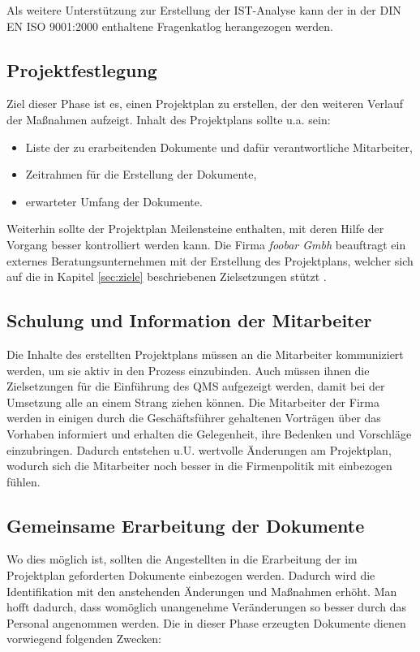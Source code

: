 Als weitere Unterstützung zur Erstellung der IST-Analyse kann der in
der DIN EN ISO 9001:2000 enthaltene Fragenkatlog herangezogen werden.

\subsection{Projektfestlegung}
Ziel dieser Phase ist es, einen Projektplan zu erstellen, der den weiteren
Verlauf der Maßnahmen aufzeigt. Inhalt des Projektplans sollte u.a. sein:

\begin{itemize}
  \item Liste der zu erarbeitenden Dokumente und dafür verantwortliche
  Mitarbeiter,
  \item Zeitrahmen für die Erstellung der Dokumente,
  \item erwarteter Umfang der Dokumente.
\end{itemize}

Weiterhin sollte der Projektplan Meilensteine enthalten, mit deren Hilfe der 
Vorgang besser kontrolliert werden kann. Die Firma \emph{foobar Gmbh} 
beauftragt ein externes Beratungsunternehmen mit der Erstellung des 
Projektplans, welcher sich auf die in Kapitel \ref{sec:ziele} beschriebenen 
Zielsetzungen stützt \citep{wittmeier}.

\subsection{Schulung und Information der Mitarbeiter}
Die Inhalte des erstellten Projektplans müssen an die Mitarbeiter kommuniziert
werden, um sie aktiv in den Prozess einzubinden. Auch müssen ihnen die
Zielsetzungen für die Einführung des QMS aufgezeigt werden, damit bei der
Umsetzung alle an einem Strang ziehen können.
Die Mitarbeiter der Firma werden in einigen durch die Geschäftsführer gehaltenen
Vorträgen über das Vorhaben informiert und erhalten die Gelegenheit, ihre
Bedenken und Vorschläge einzubringen. Dadurch entstehen u.U. wertvolle
Änderungen am Projektplan, wodurch sich die Mitarbeiter noch besser in die
Firmenpolitik mit einbezogen fühlen.

\subsection{Gemeinsame Erarbeitung der Dokumente}
Wo dies möglich ist, sollten die Angestellten in die Erarbeitung der
im Projektplan geforderten Dokumente einbezogen werden. Dadurch wird
die Identifikation mit den anstehenden Änderungen und Maßnahmen erhöht. Man
hofft dadurch, dass womöglich unangenehme Veränderungen so besser durch das
Personal angenommen werden. Die in dieser Phase erzeugten Dokumente dienen
vorwiegend folgenden Zwecken:

